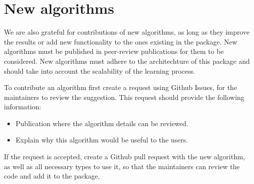 \documentclass[letterpaper,10pt,english]{sphinxmanual}
\begin{document}
\section{New algorithms}
\label{\detokenize{package/contributors:new-algorithms}}
We are also grateful for contributions of new algorithms, as long as they improve the results or add new functionality to the ones existing in the package.
New algorithms must be published in peer-review publications for them to be considered. New algorithms must adhere to the architechture of this package and
should take into account the scalability of the learning process.

To contribute an algorithm first create a request using Github Issues, for the maintainers to review the suggestion. This request should provide the following information:
\begin{itemize}
\item {} 
Publication where the algorithm details can be reviewed.

\item {} 
Explain why this algorithm would be useful to the users.

\end{itemize}

If the request is accepted, create a Github pull request with the new algorithm, as well as all necessary types to use it, so that the maintainers can review the
code and add it to the package.


\renewcommand{\indexname}{Index}
\printindex
\end{document}
